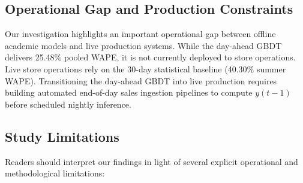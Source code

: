 \documentclass[conference]{IEEEtran}
\begin{document}
\subsection{Operational Gap and Production Constraints}
Our investigation highlights an important operational gap between offline academic models and live production systems. While the day-ahead GBDT delivers 25.48\% pooled WAPE, it is not currently deployed to store operations. Live store operations rely on the 30-day statistical baseline (40.30\% summer WAPE). Transitioning the day-ahead GBDT into live production requires building automated end-of-day sales ingestion pipelines to compute $y(t-1)$ before scheduled nightly inference.

\subsection{Study Limitations}
Readers should interpret our findings in light of several explicit operational and methodological limitations:
\end{document}
